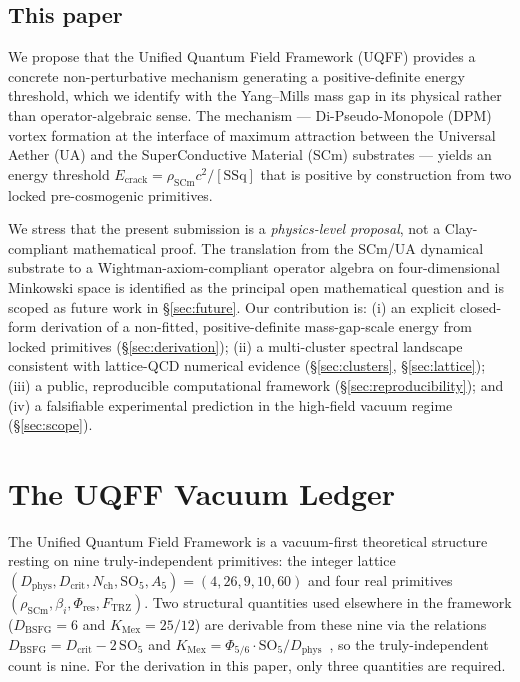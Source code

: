 \documentclass[11pt,a4paper,onecolumn]{article}
\theoremstyle{plain}
\theoremstyle{definition}
\theoremstyle{remark}
\begin{document}
\subsection{This paper}

We propose that the Unified Quantum Field Framework (UQFF) provides a
concrete non-perturbative mechanism generating a positive-definite
energy threshold, which we identify with the Yang--Mills mass gap in
its physical rather than operator-algebraic sense. The mechanism ---
Di-Pseudo-Monopole (DPM) vortex formation at the interface of maximum
attraction between the Universal Aether (UA) and the SuperConductive
Material (SCm) substrates --- yields an energy threshold
$E_{\text{crack}} = \rho_{\mathrm{SCm}} c^2 / [\mathrm{SSq}]$ that is
positive by construction from two locked pre-cosmogenic primitives.

We stress that the present submission is a \emph{physics-level
proposal}, not a Clay-compliant mathematical proof. The
translation from the SCm/UA dynamical substrate to a
Wightman-axiom-compliant operator algebra on four-dimensional
Minkowski space is identified as the principal open mathematical
question and is scoped as future work in \S\ref{sec:future}. Our
contribution is: (i) an explicit closed-form derivation of a
non-fitted, positive-definite mass-gap-scale energy from locked
primitives (\S\ref{sec:derivation}); (ii) a multi-cluster spectral
landscape consistent with lattice-QCD numerical evidence
(\S\ref{sec:clusters}, \S\ref{sec:lattice}); (iii) a public,
reproducible computational framework
(\S\ref{sec:reproducibility}); and (iv) a falsifiable experimental
prediction in the high-field vacuum regime (\S\ref{sec:scope}).

\section{The UQFF Vacuum Ledger}\label{sec:ledger}

The Unified Quantum Field Framework is a vacuum-first theoretical
structure resting on nine truly-independent primitives: the integer
lattice $(D_{\mathrm{phys}}, D_{\mathrm{crit}}, N_{\mathrm{ch}},
\mathrm{SO}_5, A_5) = (4, 26, 9, 10, 60)$ and four real primitives
$(\rho_{\mathrm{SCm}}, \beta_i, \Phi_{\mathrm{res}}, F_{\mathrm{TRZ}})$.
Two structural quantities used elsewhere in the framework
($D_{\mathrm{BSFG}} = 6$ and $K_{\mathrm{Mex}} = 25/12$) are derivable
from these nine via the relations $D_{\mathrm{BSFG}} =
D_{\mathrm{crit}} - 2\,\mathrm{SO}_5$ and $K_{\mathrm{Mex}} =
\Phi_{5/6} \cdot \mathrm{SO}_5 / D_{\mathrm{phys}}$~\cite{murphy2026paper1521, murphy2026paper1522}, so the truly-independent count is nine.
For the derivation in this paper, only three quantities are required.
\end{document}
